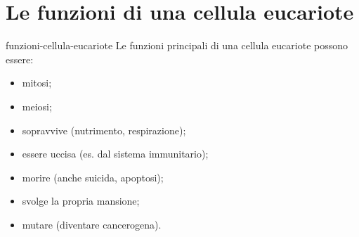 \documentclass[preview]{standalone}
\begin{document}
\genpage

\section{Le funzioni di una cellula eucariote}

\begin{snippet}{funzioni-cellula-eucariote}
    Le funzioni principali di una cellula eucariote possono essere:

    \begin{itemize}
        \item mitosi;
        \item meiosi;
        \item sopravvive (nutrimento, respirazione);
        \item essere uccisa (es. dal sistema immunitario);
        \item morire (anche suicida, apoptosi);
        \item svolge la propria mansione;
        \item mutare (diventare cancerogena).
    \end{itemize}
\end{snippet}
\end{document}
